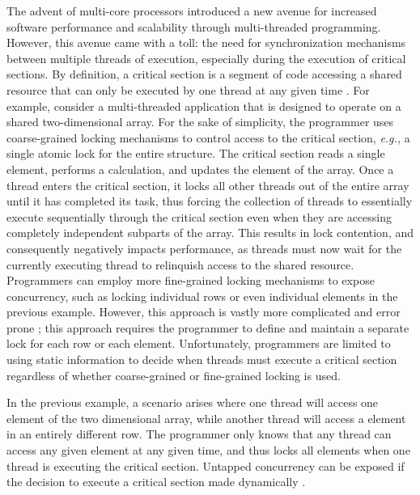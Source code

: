\documentclass[11pt]{book}
\begin{document}
The advent of multi-core processors introduced a new avenue for increased software
performance and scalability through multi-threaded programming.  However, this avenue came
with a toll: the need for synchronization mechanisms between multiple threads of
execution, especially during the execution of critical sections.  By definition, a
critical section is a segment of code accessing a shared resource that can only be
executed by one thread at any given time \cite{os_concepts}.  For example, consider a
multi-threaded application that is designed to operate on a shared two-dimensional array.
For the sake of simplicity, the programmer uses coarse-grained locking mechanisms to
control access to the critical section, \emph{e.g.,} a single atomic lock for the entire
structure.  The critical section reads a single element, performs a calculation, and
updates the element of the array.  Once a thread enters the critical section, it locks all
other threads out of the entire array until it has completed its task, thus forcing the
collection of threads to essentially execute sequentially through the critical section
even when they are accessing completely independent subparts of the array.  This results
in lock contention, and consequently negatively impacts performance, as threads must now
wait for the currently executing thread to relinquish access to the shared resource.
Programmers can employ more fine-grained locking mechanisms to expose concurrency, such as
locking individual rows or even individual elements in the previous example.  However,
this approach is vastly more complicated and error prone \cite{sle_rajwar}; this approach
requires the programmer to define and maintain a separate lock for each row or each
element.  Unfortunately, programmers are limited to using static information to decide
when threads must execute a critical section regardless of whether coarse-grained or
fine-grained locking is used.

In the previous example, a scenario arises where one thread will access one element of the
two dimensional array, while another thread will access a element in an entirely different
row.  The programmer only knows that any thread can access any given element at any given
time, and thus locks all elements when one thread is executing the critical
section. Untapped concurrency can be exposed if the decision to execute a critical section
made dynamically \cite{intel_prog_ref}.

\end{document}
